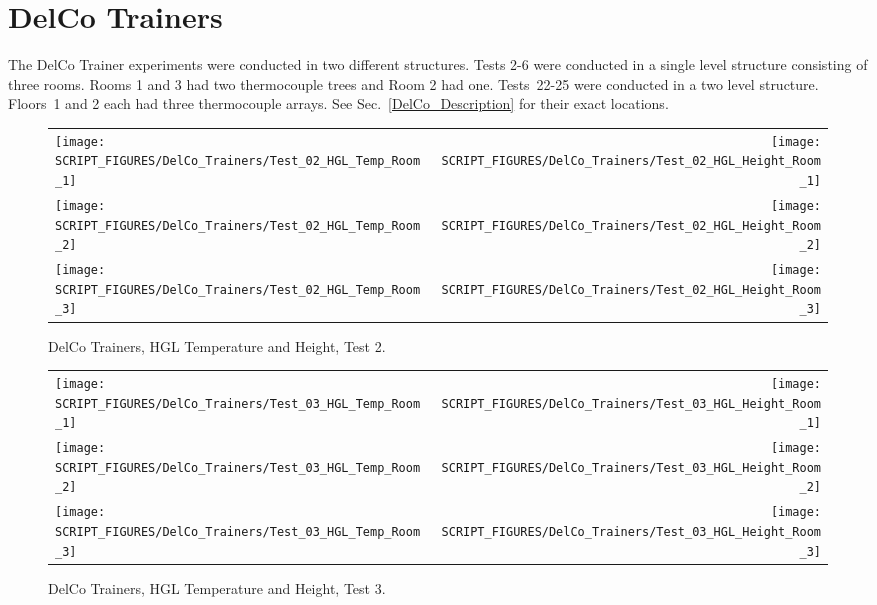 \clearpage

\section{DelCo Trainers}

The DelCo Trainer experiments were conducted in two different structures. Tests 2-6 were conducted in a single level structure consisting of three rooms. Rooms 1 and 3 had two thermocouple trees and Room 2 had one. Tests~22-25 were conducted in a two level structure. Floors~1 and 2 each had three thermocouple arrays. See Sec.~\ref{DelCo_Description} for their exact locations.

\newpage


\begin{figure}[p]
\begin{tabular*}{\textwidth}{l@{\extracolsep{\fill}}r}
\texttt{[image: SCRIPT\_FIGURES/DelCo\_Trainers/Test\_02\_HGL\_Temp\_Room\_1]} &
\texttt{[image: SCRIPT\_FIGURES/DelCo\_Trainers/Test\_02\_HGL\_Height\_Room\_1]} \\
\texttt{[image: SCRIPT\_FIGURES/DelCo\_Trainers/Test\_02\_HGL\_Temp\_Room\_2]} &
\texttt{[image: SCRIPT\_FIGURES/DelCo\_Trainers/Test\_02\_HGL\_Height\_Room\_2]} \\
\texttt{[image: SCRIPT\_FIGURES/DelCo\_Trainers/Test\_02\_HGL\_Temp\_Room\_3]} &
\texttt{[image: SCRIPT\_FIGURES/DelCo\_Trainers/Test\_02\_HGL\_Height\_Room\_3]}
\end{tabular*}
\caption[DelCo Trainers, HGL Temperature and Height, Test 2]
{DelCo Trainers, HGL Temperature and Height, Test 2.}
\label{DelCo_HGL_2}
\end{figure}

\begin{figure}[p]
\begin{tabular*}{\textwidth}{l@{\extracolsep{\fill}}r}
\texttt{[image: SCRIPT\_FIGURES/DelCo\_Trainers/Test\_03\_HGL\_Temp\_Room\_1]} &
\texttt{[image: SCRIPT\_FIGURES/DelCo\_Trainers/Test\_03\_HGL\_Height\_Room\_1]} \\
\texttt{[image: SCRIPT\_FIGURES/DelCo\_Trainers/Test\_03\_HGL\_Temp\_Room\_2]} &
\texttt{[image: SCRIPT\_FIGURES/DelCo\_Trainers/Test\_03\_HGL\_Height\_Room\_2]} \\
\texttt{[image: SCRIPT\_FIGURES/DelCo\_Trainers/Test\_03\_HGL\_Temp\_Room\_3]} &
\texttt{[image: SCRIPT\_FIGURES/DelCo\_Trainers/Test\_03\_HGL\_Height\_Room\_3]}
\end{tabular*}
\caption[DelCo Trainers, HGL Temperature and Height, Test 3]
{DelCo Trainers, HGL Temperature and Height, Test 3.}
\label{DelCo_HGL_3}
\end{figure}

